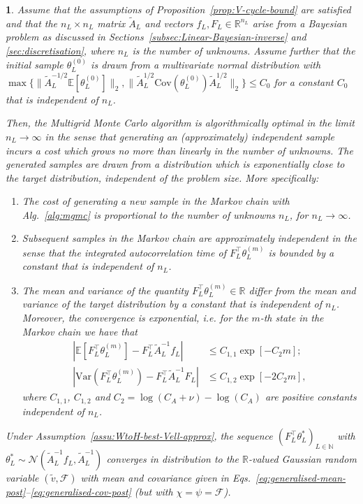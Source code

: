\documentclass[11pt,english]{article}
\theoremstyle{plain}
\theoremstyle{plain}
\theoremstyle{plain}
\theoremstyle{plain}
\newtheorem{cor}[thm]{\protect\corollaryname}
\numberwithin{equation}{section}
\providecommand{\corollaryname}{Corollary}
\begin{document}
\begin{cor}\label{cor:mgmc_optimality}
  Assume that the assumptions of Proposition~\ref{prop:V-cycle-bound} are satisfied and that the $n_L\times n_L$ matrix $\widetilde{A}_L$ and vectors $f_L, F_L\in \mathbb{R}^{n_L}$ arise from a Bayesian problem as discussed in Sections~\ref{subsec:Linear-Bayesian-inverse} and \ref{sec:discretisation}, where $n_L$ is the number of unknowns. Assume further that the initial sample $\theta_L^{(0)}$ is drawn from a multivariate normal distribution with $\max\{\|\widetilde{A}_L^{-1/2}\mathbb{E}[\theta_L^{(0)}]\|_2,\|\widetilde{A}_L^{1/2} \mathrm{Cov}(\theta_L^{(0)})\widetilde{A}_L^{1/2}\|_2\} \le C_0$ for a constant $C_0$ that is independent of $n_L$.

  Then, the Multigrid Monte Carlo algorithm is algorithmically optimal in the limit $n_L \rightarrow \infty$ in the sense that generating an (approximately) independent sample incurs a cost which grows no more than linearly in the number of unknowns. The generated samples are drawn from a distribution which is exponentially close to the target distribution, independent of the problem size. More specifically:
	\begin{enumerate}
        \item The cost of generating a new sample in the Markov chain with Alg.~\ref{alg:mgmc} is proportional to the number of unknowns $n_L$, for $n_L \to \infty$.
		\item Subsequent samples in the Markov chain are approximately independent in the sense that the integrated autocorrelation time of $F_L^\top \theta_L^{(m)}$ is bounded by a constant that is independent of $n_L$.
		\item The mean and variance of the quantity $F_L^\top\theta_L^{(m)}\in\mathbb{R}$ differ from the mean and variance of the target distribution by a constant that is independent of $n_L$. Moreover, the convergence is exponential, i.e. for the $m$-th state in the Markov chain we have that
			\begin{align*}
				\left|\mathbb{E}[F_L^\top\theta_{L}^{(m)}]-F_L^\top\widetilde{A}_{L}^{-1}f_{L}\right| & \leq C_{1,1} \exp[-C_2 m];             \\
				\left|\mathrm{Var}(F_L^\top\theta_{L}^{(m)})-F_L^\top\widetilde{A}_{L}^{-1}F_L\right|       & \leq C_{1,2} \exp[-2C_2 m],
			\end{align*}
			where $C_{1,1}$, $C_{1,2}$ and $C_2=\log(C_A+\nu)-\log(C_A)$ are positive constants independent of $n_L$. 
                      \end{enumerate}
            Under Assumption~\ref{assu:WtoH-best-Vell-approx}, the sequence $(F_{L}^{\top}\theta_{L}^{*})_{L\in\mathbb{N}}$
            with $\theta_{L}^{*}\sim\mathcal{N}(\widetilde{A}_{L}^{-1}f_{L},\widetilde{A}_{L}^{-1})$
            converges in distribution to the $\mathbb{R}$-valued Gaussian random variable $(\widetilde{v},\mathcal{F})$ with mean and covariance given in Eqs.~\eqref{eq:generalised-mean-post}--\eqref{eq:generalised-cov-post}
            (but with $\chi=\psi=\mathcal{F}$).

\end{cor}
\end{document}
